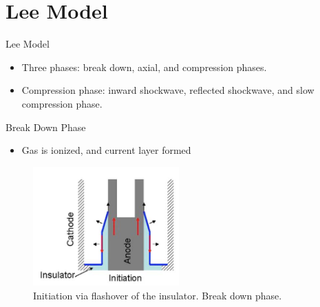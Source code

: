 \section{Lee Model}

\begin{frame} {Lee Model}
    \begin{itemize}
        \item Three phases: break down, axial, and compression phases.
        \item Compression phase: inward shockwave, reflected shockwave, and slow compression phase.
    \end{itemize}
\end{frame}

\begin{frame} {Break Down Phase}
    \begin{itemize}
        \item Gas is ionized, and current layer formed
    \end{itemize}
    \begin{figure}
        \centering
        \includegraphics[width=0.5\textwidth]{figures/breakdown-phase.png}
        \caption{Initiation via flashover of the insulator. Break down phase. \cite{krishnan_2012_dense}}
        \label{fig:breakdown-phase}
    \end{figure}
\end{frame}

